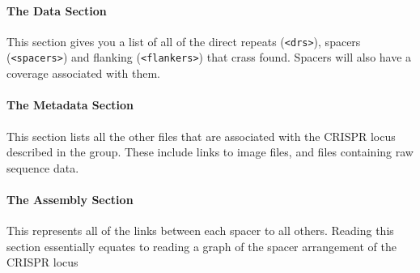 \documentclass[11pt]{article} %
\begin{document}
\paragraph{The Data Section}
This section gives you a list of all of the direct repeats (\lstinline[language=XML_new]$<drs>$), spacers (\lstinline[language=XML_new]$<spacers>$) and flanking (\lstinline[language=XML_new]$<flankers>$) that crass found.  Spacers will also have a coverage associated with them.
\paragraph{The Metadata Section}
This section lists all the other files that are associated with the CRISPR locus described in the group.  These include links to image files, and files containing raw sequence data.
\paragraph{The Assembly Section}
This represents all of the links between each spacer to all others.  Reading this section essentially equates to reading a graph of the spacer arrangement of the CRISPR locus
\end{document}

